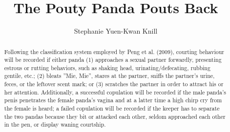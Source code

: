 \documentclass[11pt, oneside]{article}   	%
\title{The Pouty Panda Pouts Back}
\author{Stephanie Yuen-Kwan Knill}
\begin{document}
\maketitle

\begin{abstract}
Following the classification system employed by Peng et al. (2009), courting behaviour will be recorded if either panda (1) approaches a sexual partner forwardly, presenting estrous or rutting behaviors, such as shaking head, urinating/defecating, rubbing gentile, etc.; (2) bleats ''Mie, Mie'', stares at the partner, sniffs the partner's urine, feces, or the leftover scent mark; or (3) scratches the partner in order to attract his or her attention. Additionally, a successful copulation will be recorded if the male panda's penis penetrates the female panda's vagina and at a latter time a high chirp cry from the female is heard; a failed copulation will be recorded if the keeper has to separate the two pandas because they bit or attacked each other, seldom approached each other in the pen, or display waning courtship. 
\end{abstract}
\end{document}
